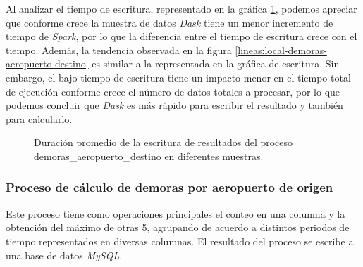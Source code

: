 Al analizar el tiempo de escritura, representado en la gráfica \ref{lineas:local-demoras-aeropuerto-destino-write}, podemos apreciar que conforme crece la muestra de datos \textit{Dask} tiene un menor incremento de tiempo de \textit{Spark}, por lo que la diferencia entre el tiempo de escritura crece con el tiempo. Además, la tendencia observada en la figura \ref{lineas:local-demoras-aeropuerto-destino} es similar a la representada en la gráfica de escritura. Sin embargo, el bajo tiempo de escritura tiene un impacto menor en el tiempo total de ejecución conforme crece el número de datos totales a procesar, por lo que podemos concluir que \textit{Dask} es más rápido para escribir el resultado y también para calcularlo.

\begin{figure}
\centering
{}
\caption{Duración promedio de la escritura de resultados del proceso demoras\_aeropuerto\_destino en diferentes muestras.}
\label{lineas:local-demoras-aeropuerto-destino-write}
\end{figure}

\subsubsection{Proceso de cálculo de demoras por aeropuerto de origen}

Este proceso tiene como operaciones principales el conteo en una columna y la obtención del máximo de otras 5, agrupando de acuerdo a distintos periodos de tiempo representados en diversas columnas. El resultado del proceso se escribe a una base de datos \textit{MySQL}.

